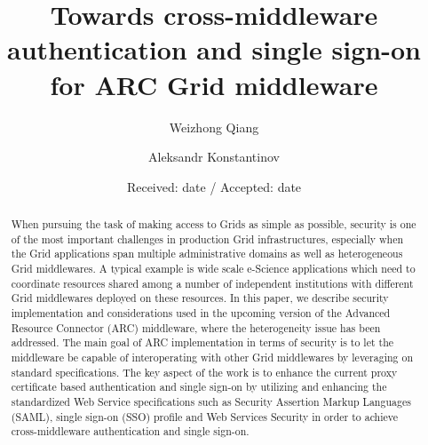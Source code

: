 \documentclass[twocolumn]{svjour3}         %
\begin{document}
\title{Towards cross-middleware authentication and single sign-on for ARC Grid middleware
}
\author{Weizhong Qiang       \and
        Aleksandr Konstantinov %
}

\date{Received: date / Accepted: date}
\maketitle
\begin{abstract}
When pursuing the task of making access to Grids as simple as possible, security is one of the most important challenges in production Grid infrastructures, especially when the Grid applications span multiple administrative domains as well as heterogeneous Grid middlewares. A typical example is wide scale e-Science applications which need to coordinate resources shared among a number of independent institutions with different Grid middlewares deployed on these resources. In this paper, we describe security implementation and considerations used in the upcoming version of the Advanced Resource Connector (ARC) middleware, where the heterogeneity issue has been addressed. The main goal of ARC implementation in terms of security is to let the middleware be capable of interoperating with other Grid middlewares by leveraging on standard specifications. The key aspect of the work is to enhance the current proxy certificate based authentication and single sign-on by utilizing and enhancing the standardized Web Service specifications such as Security Assertion Markup Languages (SAML), single sign-on (SSO) profile and Web Services Security in order to achieve cross-middleware authentication and single sign-on.
\end{abstract}
\end{document}
